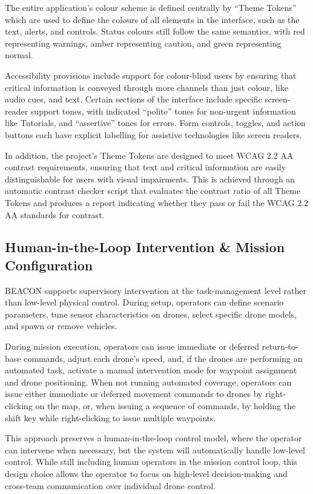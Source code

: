 The entire application's colour scheme is defined centrally by ``Theme Tokens'' which are used to define the colours of all elements in the interface, such as the text, alerts, and controls.
Status colours still follow the same semantics, with red representing warnings, amber representing caution, and green representing normal.

Accessibility provisions include support for colour-blind users by ensuring that critical information is conveyed through more channels than just colour, like audio cues, and text.
Certain sections of the interface include specific screen-reader support tones, with indicated ``polite'' tones for non-urgent information like Tutorials, and ``assertive'' tones for errors.
Form controls, toggles, and action buttons each have explicit labelling for assistive technologies like screen readers.

In addition, the project's Theme Tokens are designed to meet WCAG 2.2 AA contrast requirements, ensuring that text and critical information are easily distinguishable for users with visual impairments.
This is achieved through an automatic contrast checker script that evaluates the contrast ratio of all Theme Tokens and produces a report indicating whether they pass or fail the WCAG 2.2 AA standards for contrast.

\subsection{Human-in-the-Loop Intervention \& Mission Configuration}\label{subsec:human-in-the-loop-intervention-and-mission-configuration}

BEACON supports supervisory intervention at the task-management level rather than low-level physical control.
During setup, operators can define scenario parameters, tune sensor characteristics on drones, select specific drone models, and spawn or remove vehicles.

During mission execution, operators can issue immediate or deferred return-to-base commands, adjust each drone's speed, and, if the drones are performing an automated task, activate a manual intervention mode for waypoint assignment and drone positioning.
When not running automated coverage, operators can issue either immediate or deferred movement commands to drones by right-clicking on the map, or, when issuing a sequence of commands, by holding the shift key while right-clicking to issue multiple waypoints.

This approach preserves a human-in-the-loop control model, where the operator can intervene when necessary, but the system will automatically handle low-level control.
While still including human operators in the mission control loop, this design choice allows the operator to focus on high-level decision-making and cross-team communication over individual drone control.

